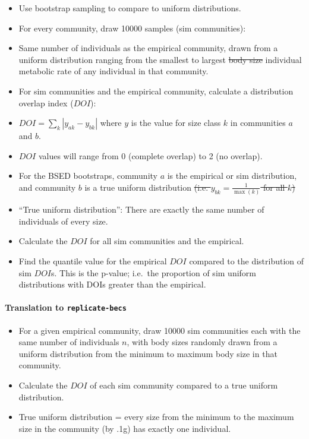 \documentclass[]{article}
\providecommand{\tightlist}{%
  \setlength{\itemsep}{0pt}\setlength{\parskip}{0pt}}
\let\oldparagraph\paragraph
\renewcommand{\paragraph}[1]{\oldparagraph{#1}\mbox{}}
\begin{document}
\begin{itemize}
\tightlist
\item
  Use bootstrap sampling to compare to uniform distributions.
\item
  For every community, draw 10000 samples (sim communities):
\item
  Same number of individuals as the empirical community, drawn from a
  uniform distribution ranging from the smallest to largest \sout{body
  size} individual metabolic rate of any individual in that community.
\item
  For sim communities and the empirical community, calculate a
  distribution overlap index (\(DOI\)):
\item
  \(DOI = \sum_k {|y_{ak} - y_{bk}|}\) where \(y\) is the value for size
  class \(k\) in communities \(a\) and \(b\).
\item
  \(DOI\) values will range from 0 (complete overlap) to 2 (no overlap).
\item
  For the BSED bootstraps, community \(a\) is the empirical or sim
  distribution, and community \(b\) is a true uniform distribution
  \sout{(i.e. \(y_{bk} = \frac{1}{\max(k)}\) for all \(k\))}
\item
  ``True uniform distribution'': There are exactly the same number of
  individuals of every size.
\item
  Calculate the \(DOI\) for all sim communities and the empirical.
\item
  Find the quantile value for the empirical \(DOI\) compared to the
  distribution of sim \(DOI\)s. This is the p-value; i.e.~the proportion
  of sim uniform distributions with DOIs greater than the empirical.
\end{itemize}

\paragraph{\texorpdfstring{Translation to
\texttt{replicate-becs}}{Translation to replicate-becs}}\label{translation-to-replicate-becs-4}

\begin{itemize}
\tightlist
\item
  For a given empirical community, draw 10000 sim communities each with
  the same number of individuals \(n\), with body sizes randomly drawn
  from a uniform distribution from the minimum to maximum body size in
  that community.
\item
  Calculate the \(DOI\) of each sim community compared to a true uniform
  distribution.
\item
  True uniform distribution = every size from the minimum to the maximum
  size in the community (by .1g) has exactly one individual.
\end{itemize}
\end{document}
